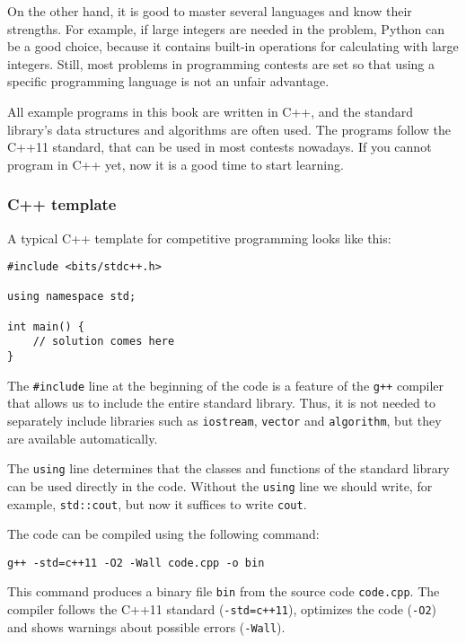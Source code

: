 On the other hand, it is good to
master several languages and know
their strengths.
For example, if large integers are needed
in the problem,
Python can be a good choice, because it
contains built-in operations for
calculating with large integers.
Still, most problems in programming contests
are set so that
using a specific programming language
is not an unfair advantage.

All example programs in this book are written in C++,
and the standard library's
data structures and algorithms are often used.
The programs follow the C++11 standard,
that can be used in most contests nowadays.
If you cannot program in C++ yet,
now it is a good time to start learning.

\subsubsection{C++ template}

A typical C++ template for competitive programming
looks like this:

\begin{lstlisting}
#include <bits/stdc++.h>

using namespace std;

int main() {
    // solution comes here
}
\end{lstlisting}

The \texttt{\#include} line at the beginning
of the code is a feature of the \texttt{g++} compiler
that allows us to include the entire standard library.
Thus, it is not needed to separately include
libraries such as \texttt{iostream},
\texttt{vector} and \texttt{algorithm},
but they are available automatically.

The \texttt{using} line determines
that the classes and functions
of the standard library can be used directly
in the code.
Without the \texttt{using} line we should write,
for example, \texttt{std::cout},
but now it suffices to write \texttt{cout}.

The code can be compiled using the following command:

\begin{lstlisting}
g++ -std=c++11 -O2 -Wall code.cpp -o bin
\end{lstlisting}

This command produces a binary file \texttt{bin}
from the source code \texttt{code.cpp}.
The compiler follows the C++11 standard
(\texttt{-std=c++11}),
optimizes the code (\texttt{-O2})
and shows warnings about possible errors (\texttt{-Wall}).

